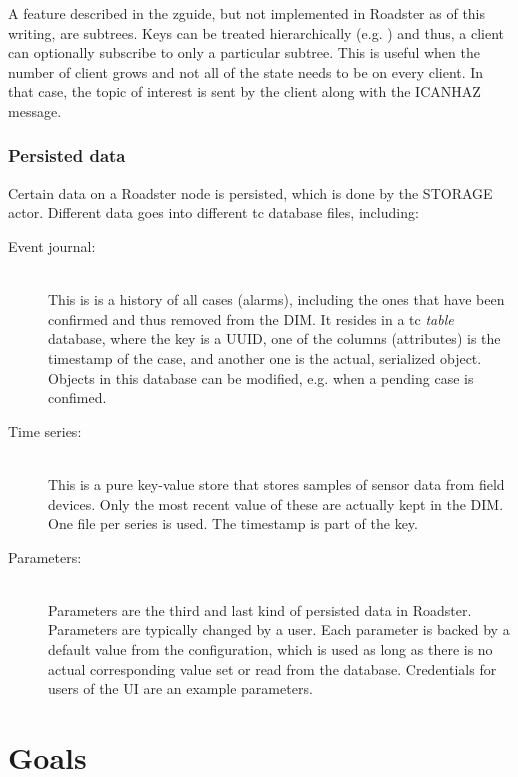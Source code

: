 A feature described in the \gls{zguide}, but not implemented in Roadster as of
this writing, are subtrees.
Keys can be treated hierarchically (e.g. ) and thus, a
client can optionally subscribe to only a particular subtree. This is useful
when the number of client grows and not all of the state needs to be on every
client. In that case, the topic of interest is sent by the client along with
the ICANHAZ message.


\subsubsection{Persisted data}\label{sec:scope:persisted_data}
Certain data on a Roadster node is persisted, which is done by the STORAGE
actor. Different data goes into different \gls{tc} database files, including:

\begin{description}
	\item [ Event journal: ] \hfill\\
		This is is a history of all cases (alarms), including the ones
		that have been confirmed and thus removed from the DIM. It
		resides in a \gls{tc} \emph{table} database, where the key is a
		\gls{UUID}, one of the columns (attributes) is the timestamp of
		the case, and another one is the actual, serialized 
		object. Objects in this database can be modified, e.g. when a
		pending case is confimed.

	\item [ Time series: ] \hfill\\
		This is a pure key-value store that stores samples of sensor
		data from field devices. Only the most recent value of these
		are actually kept in the DIM. One file per series is used. The
		timestamp is part of the key.

	\item [ Parameters: ] \hfill\\
		Parameters are the third and last kind of persisted data in
		Roadster. Parameters are typically changed by a user. Each
		parameter is backed by a default value from the configuration,
		which is used as long as there is no actual corresponding value
		set or read from the database. Credentials for users of the UI
		are an example parameters.
\end{description}

\section{Goals}

